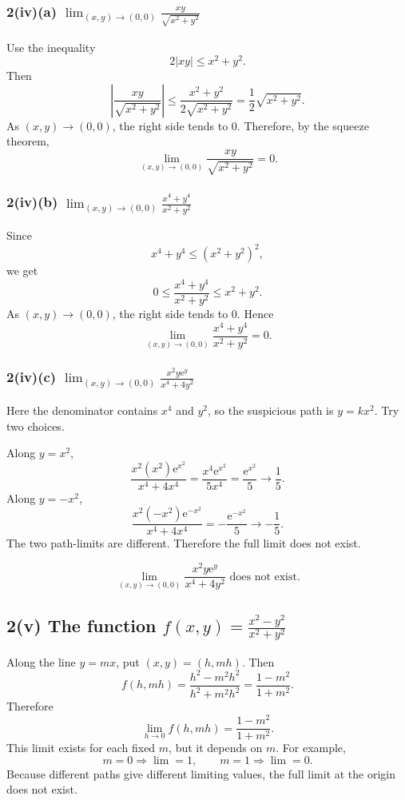 \documentclass[11pt]{article}
\newcommand{\abs}[1]{\left\lvert #1 \right\rvert}
\newcommand{\e}{\mathrm e}
\begin{document}
\subsubsection*{2(iv)(a) \(\displaystyle \lim_{(x,y)\to(0,0)}\frac{xy}{\sqrt{x^2+y^2}}\)}

Use the inequality
\[
2\abs{xy}\leq x^2+y^2.
\]
Then
\[
\left|\frac{xy}{\sqrt{x^2+y^2}}\right|
\leq \frac{x^2+y^2}{2\sqrt{x^2+y^2}}
=\frac12\sqrt{x^2+y^2}.
\]
As \((x,y)\to(0,0)\), the right side tends to \(0\). Therefore, by the squeeze theorem,
\[
\boxed{\lim_{(x,y)\to(0,0)}\frac{xy}{\sqrt{x^2+y^2}}=0.}
\]

\subsubsection*{2(iv)(b) \(\displaystyle \lim_{(x,y)\to(0,0)}\frac{x^4+y^4}{x^2+y^2}\)}

Since
\[
x^4+y^4\leq (x^2+y^2)^2,
\]
we get
\[
0\leq \frac{x^4+y^4}{x^2+y^2}\leq x^2+y^2.
\]
As \((x,y)\to(0,0)\), the right side tends to \(0\). Hence
\[
\boxed{\lim_{(x,y)\to(0,0)}\frac{x^4+y^4}{x^2+y^2}=0.}
\]

\subsubsection*{2(iv)(c) \(\displaystyle \lim_{(x,y)\to(0,0)}\frac{x^2y\e^y}{x^4+4y^2}\)}

Here the denominator contains \(x^4\) and \(y^2\), so the suspicious path is \(y=kx^2\). Try two choices.

Along \(y=x^2\),
\[
\frac{x^2(x^2)\e^{x^2}}{x^4+4x^4}
=\frac{x^4\e^{x^2}}{5x^4}
=\frac{\e^{x^2}}{5}\to\frac15.
\]
Along \(y=-x^2\),
\[
\frac{x^2(-x^2)\e^{-x^2}}{x^4+4x^4}
=-\frac{\e^{-x^2}}{5}\to -\frac15.
\]
The two path-limits are different. Therefore the full limit does not exist.

\begin{answerbox}
\[
\boxed{\lim_{(x,y)\to(0,0)}\frac{x^2y\e^y}{x^4+4y^2}\text{ does not exist}.}
\]
\end{answerbox}

\subsection{2(v) The function \(\displaystyle f(x,y)=\frac{x^2-y^2}{x^2+y^2}\)}

Along the line \(y=mx\), put \((x,y)=(h,mh)\). Then
\[
f(h,mh)=\frac{h^2-m^2h^2}{h^2+m^2h^2}
=\frac{1-m^2}{1+m^2}.
\]
Therefore
\[
\lim_{h\to0}f(h,mh)=\frac{1-m^2}{1+m^2}.
\]
This limit exists for each fixed \(m\), but it depends on \(m\). For example,
\[
m=0\Rightarrow \lim=1,
\qquad
m=1\Rightarrow \lim=0.
\]
Because different paths give different limiting values, the full limit at the origin does not exist.
\end{document}
